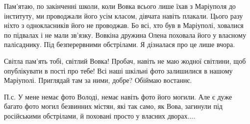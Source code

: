 
Пам'ятаю, по закінченні школи, коли Вовка всього лише їхав з Маріуполя до
інституту, ми проводжали його усім класом, дівчата навіть плакали. Цього разу
ніхто з однокласників його не проводжав. Бо всі, хто був в Маріуполі, ховалися
по підвалах і не мали зв'язку. Вовкіна дружина Олена  поховала його у власному
палісаднику. Під безперервними обстрілами. Я дізналася про це лише вчора. 


Світла пам'ять тобі, світлий Вовка! Пробач, навіть не маю жодної світлини, щоб
опублікувати в пості про тебе! Всі наші шкільні фото залишилися в нашому
Маріуполі. Приглядай там за ними, добре? Обіймаю востаннє.

П.с. У мене немає фото Володі, немає навіть фото його могили. Але є дуже багато
фото могил безвинних містян, які так само, як Вова, загинули під російськими
обстрілами, й поховані просто у власних дворах....

